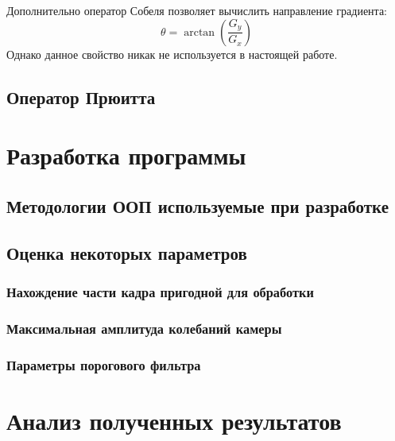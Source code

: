 Дополнительно оператор Собеля позволяет вычислить направление градиента:
$$
\theta = \arctan \left( \frac{G_y}{G_x} \right)  
$$
Однако данное свойство никак не используется в настоящей работе.

\subsection{Оператор Прюитта}

\section{Разработка программы}
\subsection{Методологии ООП используемые при разработке}
\subsection{Оценка некоторых параметров}
\subsubsection{Нахождение части кадра пригодной для обработки}
\subsubsection{Максимальная амплитуда колебаний камеры}
\subsubsection{Параметры порогового фильтра}
\section{Анализ полученных результатов}